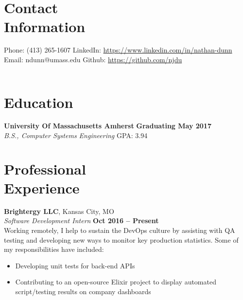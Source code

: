 \documentclass[margin,line]{resume}
\begin{document}
\begin{resume}
    \section{\mysidestyle Contact\\Information}

    Phone: (413) 265-1607 \tabto{5cm} LinkedIn: \url{https://www.linkedin.com/in/nathan-dunn}\\
    Email: ndunn@umass.edu \tabto{5cm}  Github: \url{https://github.com/njdu}\\
    \vspace{0mm}\\\vspace{-1cm}

    \section{\mysidestyle Education}

    \textbf{University Of Massachusetts Amherst} \hfill \textbf{Graduating May 2017}\\
    \textsl{B.S., Computer Systems Engineering} \hfill 
    GPA: 3.94


    \section{\mysidestyle Professional\\Experience}

    \textbf{Brightergy LLC}, Kansas City, MO \vspace{2mm}\\\vspace{1mm}%
    \textsl{Software Development Intern} \hfill \textbf{Oct 2016 -- Present}\\
    Working remotely, I help to sustain the DevOps culture by assisting with QA testing and developing new ways to monitor key production statistics.  Some of my responsibilities have included:
    \begin{itemize}
        \item Developing unit tests for back-end APIs
        \item Contributing to an open-source Elixir project to display automated script/testing results on company dashboards
    \end{itemize}
    

\end{resume}
\end{document}
